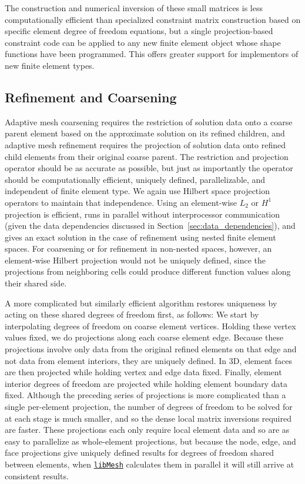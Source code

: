 \documentclass[global,twocolumn,final]{svjour}
\newcommand{\libMesh}{\href{http://libmesh.sourceforge.net}{\texttt{lib\-Mesh}}}
\begin{document}
The construction and numerical inversion of these small matrices is
less computationally efficient 
than specialized constraint matrix construction based on
specific element degree of freedom equations, but a single
projection-based constraint code can be applied to any new finite
element object whose shape functions have been programmed.  This
offers greater support for implementors of new finite element types.


\subsection{Refinement and Coarsening}
Adaptive mesh coarsening requires the restriction of solution data
onto a coarse parent element based on the approximate solution on its
refined children, and adaptive mesh refinement requires the projection
of solution data onto refined child elements from their original
coarse parent.  The restriction and projection operator should be as
accurate as possible, but just as importantly the operator should be
computationally efficient, uniquely defined, parallelizable, and
independent of finite element type.  We again use Hilbert space
projection operators to maintain that independence.  Using an
element-wise $L_2$ or $H^1$ projection is efficient, runs in parallel
without interprocessor communication (given the data dependencies discussed in Section~\ref{sec:data_dependencies}), and gives an exact solution in
the case of refinement using nested finite element spaces.  For
coarsening or for refinement in non-nested spaces, however, an
element-wise Hilbert projection would not be
uniquely defined, since the projections from neighboring cells could
produce different function values along their shared side.

A more complicated but similarly efficient algorithm restores
uniqueness by acting on these sha\-red degrees of freedom first, as
follows:
We start by interpolating degrees of freedom on coarse element
vertices.  Holding these vertex values fixed, we do projections along
each coarse element edge.  Because these projections involve only data
from the original refined elements on that edge and not data from
element interiors, they are uniquely defined.  In 3D, element faces
are then projected while holding vertex and edge data fixed.  Finally,
element interior degrees of freedom are projected while holding
element boundary data fixed.  Although the preceding series of projections is
more complicated than a single per-element projection, the number of
degrees of freedom to be solved for at each stage is much smaller, and
so the dense local matrix inversions required are faster.  These
projections each only require local element data and so are as easy to
parallelize as whole-element projections, but because the node, edge,
and face projections give uniquely defined results
for degrees of freedom shared between elements, when \libMesh{}
calculates them in parallel it will still arrive at consistent results.
\end{document}
